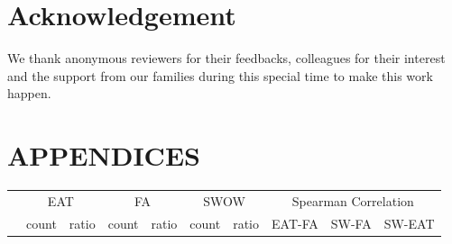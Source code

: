 \documentclass[letterpaper]{article} %
\begin{document}
\section{Acknowledgement}
We thank anonymous reviewers for their feedbacks, colleagues for their interest and the support from our families during this special time to make this work happen.



\clearpage

\appendix

\onecolumn

\section*{APPENDICES}


\begin{table}[ht]

\centering


\begin{tabular}{@{}r|cc|cc|cc|ccc@{}}

  & \multicolumn{2}{c}{EAT} & \multicolumn{2}{c}{FA}  & \multicolumn{2}{c}{SWOW} & \multicolumn{3}{c}{Spearman Correlation}\\


& count & ratio & count & ratio & count & ratio & EAT-FA & SW-FA & SW-EAT \\
\hline


\end{tabular}
\end{table}
\end{document}

